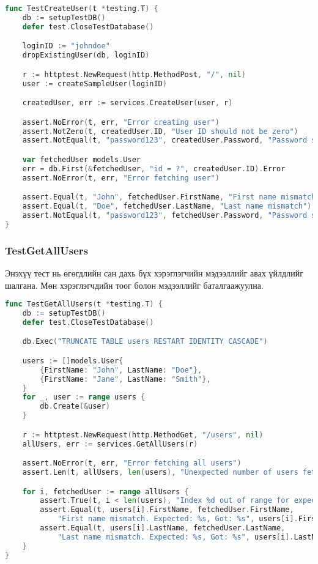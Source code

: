 \begin{lstlisting}[language=Go, caption=Test Create User Function, frame=single]
func TestCreateUser(t *testing.T) {
    db := setupTestDB()
    defer test.CloseTestDatabase()

    loginID := "johndoe"
    dropExistingUser(db, loginID)

    r := httptest.NewRequest(http.MethodPost, "/", nil)
    user := createSampleUser(loginID)

    createdUser, err := services.CreateUser(user, r)

    assert.NoError(t, err, "Error creating user")
    assert.NotZero(t, createdUser.ID, "User ID should not be zero")
    assert.NotEqual(t, "password123", createdUser.Password, "Password should be hashed")

    var fetchedUser models.User
    err = db.First(&fetchedUser, "id = ?", createdUser.ID).Error
    assert.NoError(t, err, "Error fetching user")

    assert.Equal(t, "John", fetchedUser.FirstName, "First name mismatch")
    assert.Equal(t, "Doe", fetchedUser.LastName, "Last name mismatch")
    assert.NotEqual(t, "password123", fetchedUser.Password, "Password should be hashed")
}
\end{lstlisting}

\subsubsection{TestGetAllUsers}

Энэхүү тест нь өгөгдлийн сан дахь бүх хэрэглэгчийн мэдээллийг авах үйлдлийг шалгана. Мөн хэрэглэгчдийн тоог болон мэдээллийг баталгаажуулна.

\begin{lstlisting}[language=Go, caption=Test Get All Users Function, frame=single]
func TestGetAllUsers(t *testing.T) {
    db := setupTestDB()
    defer test.CloseTestDatabase()

    db.Exec("TRUNCATE TABLE users RESTART IDENTITY CASCADE")

    users := []models.User{
        {FirstName: "John", LastName: "Doe"},
        {FirstName: "Jane", LastName: "Smith"},
    }
    for _, user := range users {
        db.Create(&user)
    }

    r := httptest.NewRequest(http.MethodGet, "/users", nil)
    allUsers, err := services.GetAllUsers(r)

    assert.NoError(t, err, "Error fetching all users")
    assert.Len(t, allUsers, len(users), "Unexpected number of users fetched")

    for i, fetchedUser := range allUsers {
        assert.True(t, i < len(users), "Index %d out of range for expected users", i)
        assert.Equal(t, users[i].FirstName, fetchedUser.FirstName, 
            "First name mismatch. Expected: %s, Got: %s", users[i].FirstName, fetchedUser.FirstName)
        assert.Equal(t, users[i].LastName, fetchedUser.LastName, 
            "Last name mismatch. Expected: %s, Got: %s", users[i].LastName, fetchedUser.LastName)
    }
}
\end{lstlisting}

